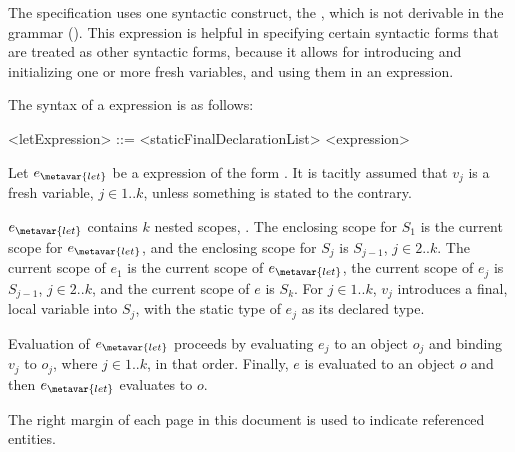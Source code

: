 \documentclass[makeidx]{article}
\begin{document}
\LMHash{}%
The specification uses one syntactic construct, the
,
which is not derivable in the grammar
().
This expression is helpful in specifying certain syntactic forms
that are treated as other syntactic forms,
because it allows for introducing and initializing one or more fresh variables,
and using them in an expression.


\LMHash{}%
The syntax of a \LET{} expression is as follows:

\begin{grammar}
<letExpression> ::= \LET{} <staticFinalDeclarationList> \IN{} <expression>
\end{grammar}

\LMHash{}%
%
Let $e_{\metavar{let}}$ be a \LET{} expression of the form
.
It is tacitly assumed that $v_j$ is a fresh variable, $j \in 1 .. k$,
unless something is stated to the contrary.

\LMHash{}%
$e_{\metavar{let}}$ contains $k$ nested scopes, .
The enclosing scope for $S_1$ is the current scope for $e_{\metavar{let}}$,
and the enclosing scope for $S_j$ is $S_{j-1}$, $j \in 2 .. k$.
The current scope of $e_1$ is the current scope of $e_{\metavar{let}}$,
the current scope of $e_j$ is $S_{j-1}$, $j \in 2 .. k$,
and the current scope of $e$ is $S_k$.
For $j \in 1 .. k$, $v_j$ introduces a final, local variable into $S_j$,
with the static type of $e_j$ as its declared type.


\LMHash{}%
Evaluation of $e_{\metavar{let}}$ proceeds by
evaluating $e_j$ to an object $o_j$ and binding $v_j$ to $o_j$,
where $j \in 1 .. k$, in that order.
Finally, $e$ is evaluated to an object $o$ and then
$e_{\metavar{let}}$ evaluates to $o$.

\LMHash{}%
The right margin of each page in this document is used to indicate
referenced entities.
\end{document}
